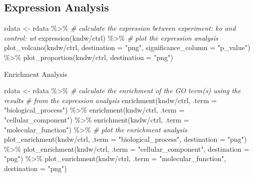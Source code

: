 \documentclass[
]{book}
\newenvironment{Shaded}{\begin{snugshade}}{\end{snugshade}}
\newcommand{\AttributeTok}[1]{\textcolor[rgb]{0.77,0.63,0.00}{#1}}
\newcommand{\CommentTok}[1]{\textcolor[rgb]{0.56,0.35,0.01}{\textit{#1}}}
\newcommand{\FunctionTok}[1]{\textcolor[rgb]{0.00,0.00,0.00}{#1}}
\newcommand{\NormalTok}[1]{#1}
\newcommand{\OtherTok}[1]{\textcolor[rgb]{0.56,0.35,0.01}{#1}}
\newcommand{\SpecialCharTok}[1]{\textcolor[rgb]{0.00,0.00,0.00}{#1}}
\newcommand{\StringTok}[1]{\textcolor[rgb]{0.31,0.60,0.02}{#1}}
\begin{document}
\hypertarget{expression-analysis}{%
\subsection{Expression Analysis}\label{expression-analysis}}

\begin{Shaded}
\begin{Highlighting}[]
\NormalTok{rdata }\OtherTok{\textless{}{-}}\NormalTok{ rdata }\SpecialCharTok{\%\textgreater{}\%}
  \CommentTok{\# calculate the expression between experiment: ko and control: wt}
  \FunctionTok{expression}\NormalTok{(kndw}\SpecialCharTok{/}\NormalTok{ctrl) }\SpecialCharTok{\%\textgreater{}\%}
  \CommentTok{\# plot the expression analysis}
  \FunctionTok{plot\_volcano}\NormalTok{(kndw}\SpecialCharTok{/}\NormalTok{ctrl, }\AttributeTok{destination =} \StringTok{"png"}\NormalTok{, }\AttributeTok{significance\_column =} \StringTok{"p\_value"}\NormalTok{) }\SpecialCharTok{\%\textgreater{}\%} 
  \FunctionTok{plot\_proportion}\NormalTok{(kndw}\SpecialCharTok{/}\NormalTok{ctrl, }\AttributeTok{destination =} \StringTok{"png"}\NormalTok{)}
\end{Highlighting}
\end{Shaded}

Enrichment Analysis

\begin{Shaded}
\begin{Highlighting}[]
\NormalTok{rdata }\OtherTok{\textless{}{-}}\NormalTok{ rdata }\SpecialCharTok{\%\textgreater{}\%}
  \CommentTok{\# calculate the enrichment of the GO term(s) using the results}
  \CommentTok{\# from the expression analysis}
  \FunctionTok{enrichment}\NormalTok{(kndw}\SpecialCharTok{/}\NormalTok{ctrl, }\AttributeTok{.term =} \StringTok{"biological\_process"}\NormalTok{) }\SpecialCharTok{\%\textgreater{}\%}
  \FunctionTok{enrichment}\NormalTok{(kndw}\SpecialCharTok{/}\NormalTok{ctrl, }\AttributeTok{.term =} \StringTok{"cellular\_component"}\NormalTok{) }\SpecialCharTok{\%\textgreater{}\%}
  \FunctionTok{enrichment}\NormalTok{(kndw}\SpecialCharTok{/}\NormalTok{ctrl, }\AttributeTok{.term =} \StringTok{"molecular\_function"}\NormalTok{) }\SpecialCharTok{\%\textgreater{}\%}
  \CommentTok{\# plot the enrichment analysis}
  \FunctionTok{plot\_enrichment}\NormalTok{(kndw}\SpecialCharTok{/}\NormalTok{ctrl, }\AttributeTok{.term =} \StringTok{"biological\_process"}\NormalTok{, }\AttributeTok{destination =} \StringTok{"png"}\NormalTok{) }\SpecialCharTok{\%\textgreater{}\%}
  \FunctionTok{plot\_enrichment}\NormalTok{(kndw}\SpecialCharTok{/}\NormalTok{ctrl, }\AttributeTok{.term =} \StringTok{"cellular\_component"}\NormalTok{, }\AttributeTok{destination =} \StringTok{"png"}\NormalTok{) }\SpecialCharTok{\%\textgreater{}\%}
  \FunctionTok{plot\_enrichment}\NormalTok{(kndw}\SpecialCharTok{/}\NormalTok{ctrl, }\AttributeTok{.term =} \StringTok{"molecular\_function"}\NormalTok{, }\AttributeTok{destination =} \StringTok{"png"}\NormalTok{) }
\end{Highlighting}
\end{Shaded}
\end{document}
